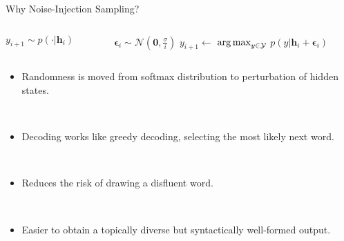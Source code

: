 \begin{frame}[t]{Why Noise-Injection Sampling?}
\begin{columns}[t]
\begin{column}{0.5\textwidth}
\setcounter{algorithm}{0}
\begin{algorithm}[H]
\begin{algorithmic}[1]
\STATE $y_{i+1} \sim p(\cdot|\mathbf{h}_i)$
\end{algorithmic}
\caption{Ancestral Sampling}
\label{alg:seq}
\end{algorithm}
\end{column}
\begin{column}{0.5\textwidth}
\begin{algorithm}[H]
\begin{algorithmic}[1]
\STATE \colorbox{green!20}{$\boldsymbol{\epsilon}_{i} \sim \mathcal{N}\left(\mathbf{0}, \frac{\sigma}{i}\right)$}
\STATE $y_{i+1} \gets$ \colorbox{red!20}{$\operatorname*{arg\,max}_{y\in\mathcal{Y}}$} $p(y|\mathbf{h}_i + \boldsymbol{\epsilon}_i)$
\end{algorithmic}
\caption{Noise-Injection Sampling}
\label{alg:seq}
\end{algorithm}

\end{column}
\end{columns}

    \begin{itemize}

        \item<2-> Randomness is moved from softmax distribution to \colorbox{green!20}{perturbation of hidden states.}

            ~\\

        \item<3-> Decoding works like greedy decoding, \colorbox{red!20}{selecting the most likely next word.}

            ~\\

        \item<4-> Reduces the risk of drawing a disfluent word.

~\\


        \item<5-> Easier to obtain a topically diverse but syntactically
            well-formed output.

    \end{itemize}



\end{frame}





